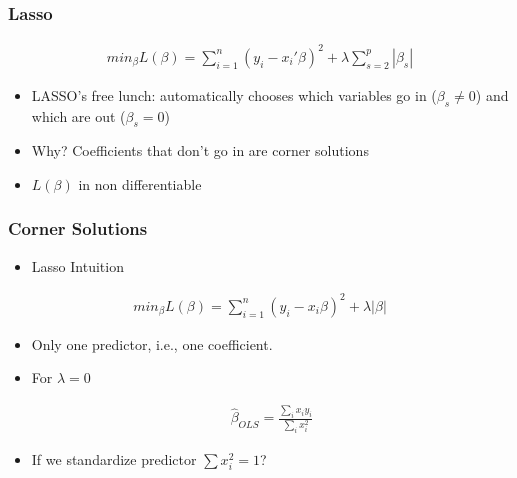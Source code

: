 \documentclass[
  shownotes,
  xcolor={svgnames},
  hyperref={colorlinks,citecolor=DarkBlue,linkcolor=DarkRed,urlcolor=DarkBlue}
  , aspectratio=169]{beamer}
\begin{document}
\begin{frame}[fragile]
\frametitle{Lasso}

\begin{align}
min_{\beta} L(\beta) = \sum_{i=1}^n (y_i-x_i'\beta)^2 + \lambda \sum_{s=2}^p |\beta_s| 
\end{align}
\bigskip
\begin{itemize}
\item  LASSO's free lunch: automatically chooses which variables go in ($\beta_s \neq 0$) and which are out  ($\beta_s = 0$)
\medskip
\item Why? Coefficients that don't go in  are corner solutions 
\medskip
\item  $L(\beta)$ in non differentiable
\end{itemize}

\end{frame}
\begin{frame}[fragile]
\frametitle{Corner Solutions}

\begin{itemize}
\item Lasso Intuition
\end{itemize}

\bigskip

\begin{align}
min_{\beta} L(\beta) = \sum_{i=1}^n (y_i-x_i \beta)^2 + \lambda|\beta| 
\end{align}

\begin{itemize}
  \item Only one predictor, i.e., one coefficient.
  \medskip
  \item For $\lambda=0$

  \begin{align}
    \hat{\beta}_{OLS}= \frac{\sum_i x_i y_i}{\sum_i x_i^2}
  \end{align}
  \item If we standardize predictor $\sum x_i^2=1$?
\end{itemize}




\end{frame}
\end{document}
